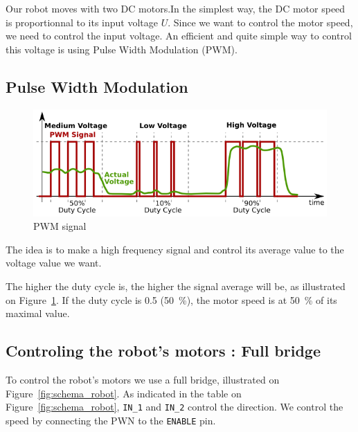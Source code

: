 

Our robot moves with two DC motors.In the simplest way, the DC motor speed is proportionnal to its
input voltage $U$.
Since we want to control the motor speed, we need to control the input voltage. An efficient and quite simple way to control this voltage is using Pulse Width Modulation (PWM).


\subsection{Pulse Width Modulation}
\begin{figure}[!ht]
 \centering
 \includegraphics[width=.8\textwidth]{images/PWM_signal}
 \caption{PWM signal}
 \label{fig:PWM_signal}
\end{figure}
The idea is to make a high frequency signal and control its average value to the voltage value we want.

The higher the duty cycle is, the higher the signal average will be, as illustrated on Figure~\ref{fig:PWM_signal}.
If the duty cycle is \num{.5} (\SI{50}{\%}), the motor speed is at \SI{50}{\%} of its maximal value.

\pagebreak
\subsection{Controling the robot's motors : Full bridge}

To control the robot's motors we use a full bridge, illustrated on Figure~\ref{fig:schema_robot}.
As indicated in the table on Figure~\ref{fig:schema_robot}, \texttt{IN_1} and \texttt{IN_2} control the direction.
We control the speed by connecting the PWN to the \texttt{ENABLE} pin.


